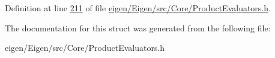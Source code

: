 Definition at line \hyperlink{eigen_2_eigen_2src_2_core_2_product_evaluators_8h_source_l00211}{211} of file \hyperlink{eigen_2_eigen_2src_2_core_2_product_evaluators_8h_source}{eigen/\+Eigen/src/\+Core/\+Product\+Evaluators.\+h}.



The documentation for this struct was generated from the following file\+:\begin{DoxyCompactItemize}
\item 
eigen/\+Eigen/src/\+Core/\+Product\+Evaluators.\+h\end{DoxyCompactItemize}
